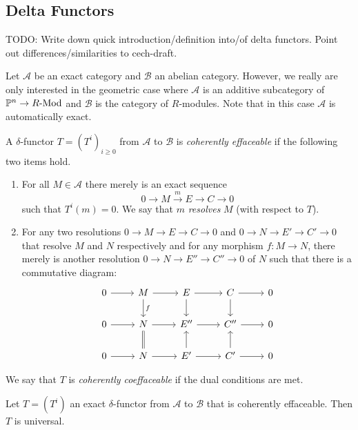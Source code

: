 \subsection{Delta Functors}


{\color{red} TODO: Write down quick introduction/definition into/of delta functors. Point out differences/similarities to cech-draft}.

Let $\mathcal A$ be an exact category and $\mathcal B$ an abelian category.
However, we really are only interested in the geometric case where $\mathcal A$ is an additive subcategory of $\mathbb{P}^n \to R\text{-}\mathrm{Mod}$ and $\mathcal B$ is the category of $R$-modules.
Note that in this case $\mathcal A$ is automatically exact.

\begin{definition}
  A $\delta$-functor $T = (T^i)_{i\geq 0}$ from $\mathcal A$ to $\mathcal B$ is \emph{coherently effaceable} if the following two items hold.
  \begin{enumerate}
    \item[i)] For all $M \in \mathcal A$ there merely is an exact sequence
      \[
        0 \to M \overset{m}{\to} E \to C \to 0
      \]
      such that $T^i(m) = 0$. We say that $m$ \emph{resolves} $M$ (with respect to $T$).
    \item[ii)] For any two resolutions $0 \to M \to E \to C \to 0$ and $0 \to N \to E' \to C' \to 0$ that resolve $M$ and $N$ respectively and for any morphism $f : M \to N$, there merely is another resolution $0 \to N \to E'' \to C'' \to 0$ of $N$ such that there is a commutative diagram:
      \[
      \begin{tikzcd}
        0 \ar[r] & M \ar[d, "f"]\ar[r] & E \ar[r]\ar[d] & C \ar[d]\ar[r] & 0\\
        0 \ar[r] & N \ar[d, equal]\ar[r] & E'' \ar[r] &  C'' \ar[r] & 0\\
        0 \ar[r] & N \ar[r] & E' \ar[r]\ar[u] & C' \ar[u]\ar[r] & 0
      \end{tikzcd}
      \]
  \end{enumerate}
  We say that $T$ is \emph{coherently coeffaceable} if the dual conditions are met.
\end{definition}

\begin{theorem}\label{coherently-effaceable-implies-universal}
  Let $T=(T^i)$ an exact $\delta$-functor from $\mathcal A$ to $\mathcal B$ that is coherently effaceable. Then $T$ is universal.
\end{theorem}


